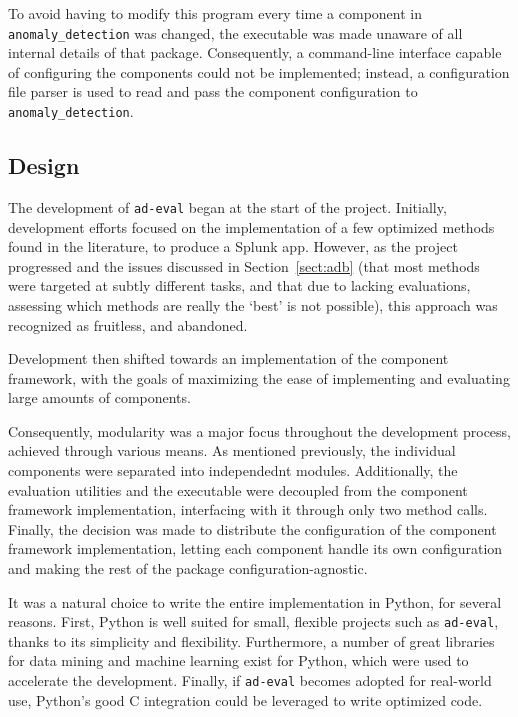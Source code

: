 To avoid having to modify this program every time a component in \texttt{anomaly\_detection} was changed, the executable was made unaware of all internal details of that package. Consequently, a command-line interface capable of configuring the components could not be implemented; instead, a configuration file parser is used to read and pass the component configuration to \texttt{anomaly\_detection}.

\subsection{Design}
\label{sect:design}

The development of \texttt{ad-eval} began at the start of the project. Initially, development efforts focused on the implementation of a few optimized methods found in the literature, to produce a Splunk app. However, as the project progressed and the issues discussed in Section~\ref{sect:adb} (that most methods were targeted at subtly different tasks, and that due to lacking evaluations, assessing which methods are really the `best' is not possible), this approach was recognized as fruitless, and abandoned.

Development then shifted towards an implementation of the component framework, with the goals of maximizing the ease of implementing and evaluating large amounts of components.

Consequently, modularity was a major focus throughout the development process, achieved through various means. As mentioned previously, the individual components were separated into independednt modules. Additionally, the evaluation utilities and the executable were decoupled from the component framework implementation, interfacing with it through only two method calls. Finally, the decision was made to distribute the configuration of the component framework implementation, letting each component handle its own configuration and making the rest of the package configuration-agnostic.

It was a natural choice to write the entire implementation in Python, for several reasons. First, Python is well suited for small, flexible projects such as \texttt{ad-eval}, thanks to its simplicity and flexibility. Furthermore, a number of great libraries for data mining and machine learning exist for Python, which were used to accelerate the development. Finally, if \texttt{ad-eval} becomes adopted for real-world use, Python's good C integration could be leveraged to write optimized code. 


